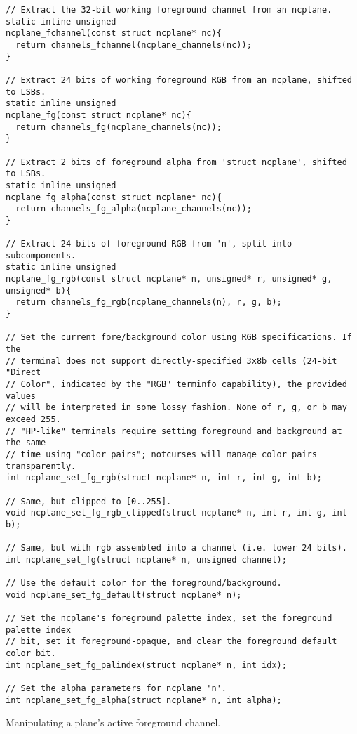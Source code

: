 \begin{listing}[!htb]
\begin{verbatim}
// Extract the 32-bit working foreground channel from an ncplane.
static inline unsigned
ncplane_fchannel(const struct ncplane* nc){
  return channels_fchannel(ncplane_channels(nc));
}

// Extract 24 bits of working foreground RGB from an ncplane, shifted to LSBs.
static inline unsigned
ncplane_fg(const struct ncplane* nc){
  return channels_fg(ncplane_channels(nc));
}

// Extract 2 bits of foreground alpha from 'struct ncplane', shifted to LSBs.
static inline unsigned
ncplane_fg_alpha(const struct ncplane* nc){
  return channels_fg_alpha(ncplane_channels(nc));
}

// Extract 24 bits of foreground RGB from 'n', split into subcomponents.
static inline unsigned
ncplane_fg_rgb(const struct ncplane* n, unsigned* r, unsigned* g, unsigned* b){
  return channels_fg_rgb(ncplane_channels(n), r, g, b);
}

// Set the current fore/background color using RGB specifications. If the
// terminal does not support directly-specified 3x8b cells (24-bit "Direct
// Color", indicated by the "RGB" terminfo capability), the provided values
// will be interpreted in some lossy fashion. None of r, g, or b may exceed 255.
// "HP-like" terminals require setting foreground and background at the same
// time using "color pairs"; notcurses will manage color pairs transparently.
int ncplane_set_fg_rgb(struct ncplane* n, int r, int g, int b);

// Same, but clipped to [0..255].
void ncplane_set_fg_rgb_clipped(struct ncplane* n, int r, int g, int b);

// Same, but with rgb assembled into a channel (i.e. lower 24 bits).
int ncplane_set_fg(struct ncplane* n, unsigned channel);

// Use the default color for the foreground/background.
void ncplane_set_fg_default(struct ncplane* n);

// Set the ncplane's foreground palette index, set the foreground palette index
// bit, set it foreground-opaque, and clear the foreground default color bit.
int ncplane_set_fg_palindex(struct ncplane* n, int idx);

// Set the alpha parameters for ncplane 'n'.
int ncplane_set_fg_alpha(struct ncplane* n, int alpha);
\end{verbatim}
\caption{Manipulating a plane's active foreground channel.}
\label{listing:planefg}
\end{listing}


